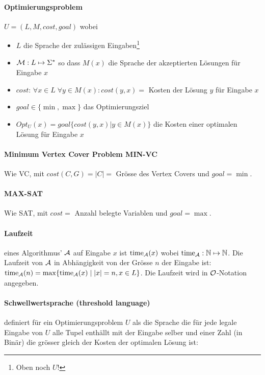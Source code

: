 \paragraph{Optimierungsproblem}
$U = (L, M, cost, goal)$ wobei
\begin{itemize}
    \item $L$ die Sprache der zulässigen Eingaben\footnote{Oben noch $U$!}
    \item $\mathcal{M}: L \mapsto \Sigma^*$ so dass $M(x)$ die Sprache der akzeptierten Lösungen für Eingabe $x$
    \item $cost$: $\forall x \in L \; \forall y \in M(x) : cost(y, x) = $ Kosten der Lösung $y$ für Eingabe $x$
    \item $goal \in \{ \min, \max \}$ das Optimierungsziel
    \item $Opt_U(x) = goal \{ cost(y, x) | y \in M(x) \}$ die Kosten einer optimalen Lösung für Eingabe $x$
\end{itemize}

\paragraph{Minimum Vertex Cover Problem MIN-VC}
Wie VC, mit $cost(C, G) = |C| = $ Grösse des Vertex Covers und $goal = \min$.

\paragraph{MAX-SAT}
Wie SAT, mit $cost = $ Anzahl belegte Variablen und $goal = \max$.

\paragraph{Laufzeit}
eines Algorithmus' $\mathcal{A}$ auf Eingabe $x$ ist $\text{time}_{\mathcal{A}} (x)$
wobei $\text{time}_{\mathcal{A}}: \mathbb{N} \mapsto \mathbb{N}$.
Die Laufzeit von $\mathcal{A}$ in Abhängigkeit von der Grösse $n$ der Eingabe ist:
$\text{time}_{\mathcal{A}} (n) = \max \{ \text{time}_{\mathcal{A}} (x) \; | \; |x| = n, x \in L \}$.
Die Laufzeit wird in  $\mathcal{O}$-Notation angegeben.

\paragraph{Schwellwertsprache (threshold language)} 
definiert für ein Optimierungsproblem $U$ als die Sprache die 
für jede legale Eingabe von $U$ alle Tupel enthällt mit der Eingabe 
selber und einer Zahl (in Binär) die grösser gleich der Kosten der optimalen Lösung ist:

